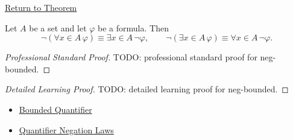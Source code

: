 \newpage
{}
\label{prf:neg-bounded}

\begin{remark*}[Return]
\hyperref[thm:neg-bounded]{Return to Theorem}
\end{remark*}

\begin{theorem*}
Let \(A\) be a set and let \(\varphi\) be a formula. Then
\[
\neg(\forall x\in A\,\varphi)\equiv \exists x\in A\,\neg\varphi,
\qquad
\neg(\exists x\in A\,\varphi)\equiv \forall x\in A\,\neg\varphi.
\]
\end{theorem*}

\begin{proof}[Professional Standard Proof]
\LRAProofBodyStart
TODO: professional standard proof for neg-bounded.
\end{proof}

\begin{proof}[Detailed Learning Proof]
\LRAProofBodyStart
TODO: detailed learning proof for neg-bounded.
\end{proof}

\begin{remark*}
\end{remark*}

\begin{dependencies}
\begin{itemize}
  \item \hyperref[def:bounded-q]{Bounded Quantifier}
  \item \hyperref[thm:qneg]{Quantifier Negation Laws}
\end{itemize}
\end{dependencies}

\clearpage
